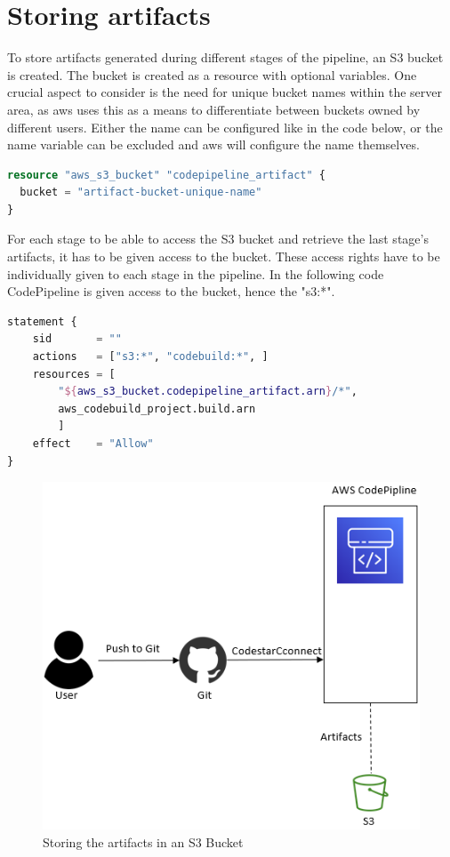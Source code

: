 \section{Storing artifacts}
To store \gls{artifact}s generated during different stages of the pipeline, an S3 bucket is created. The bucket is created as a resource with optional variables. One crucial aspect to consider is the need for unique bucket names within the server area, as \acrshort{aws} uses this as a means to differentiate between buckets owned by different users. Either the name can be configured like in the code below, or the name variable can be excluded and \acrshort{aws} will configure the name themselves.

\begin{lstlisting}[language=terraform, caption=Create an S3 Bucket, captionpos=b, frame=single]
resource "aws_s3_bucket" "codepipeline_artifact" {
  bucket = "artifact-bucket-unique-name"
}
\end{lstlisting}

For each stage to be able to access the S3 bucket and retrieve the last stage's \gls{artifact}s, it has to be given access to the bucket. These access rights have to be individually given to each stage in the pipeline. In the following code CodePipeline is given access to the bucket, hence the "s3:*".

\begin{lstlisting}[language=terraform, caption=Set permissions CodePipeline, captionpos=b, frame=single]
statement {
    sid       = ""
    actions   = ["s3:*", "codebuild:*", ]
    resources = [
        "${aws_s3_bucket.codepipeline_artifact.arn}/*",
        aws_codebuild_project.build.arn
        ]
    effect    = "Allow"
}
\end{lstlisting}

\vspace{2mm}
\begin{figure}[H]
    \centering
    \includegraphics[width=0.6\columnwidth]{Images/aws-piplin-2.png}
    \caption{Storing the artifacts in an S3 Bucket}
    \label{fig: Storing the artifacts in an S3 Bucket}
\end{figure}

